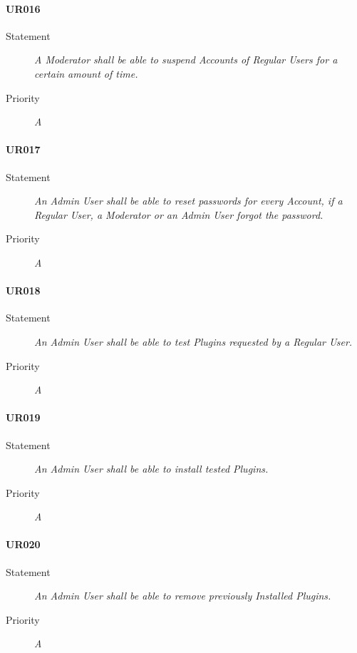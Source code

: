 \paragraph*{UR016}
\begin{description}
  \item [Statement] 
    \textit{A \gls{Moderator} shall be able to suspend \gls{Account}s of \gls{Regular User}s for a certain amount of time.}
  \item [Priority] \textit{A}
\end{description}

\paragraph*{UR017}
\begin{description}
  \item [Statement] 
    \textit{An \gls{Admin User} shall be able to reset passwords for every \gls{Account}, if a \gls{Regular User}, a \gls{Moderator} or an \gls{Admin User} forgot the password.}
  \item [Priority] \textit{A}
\end{description}

\paragraph*{UR018}
\begin{description}
  \item [Statement] 
    \textit{An \gls{Admin User} shall be able to test \gls{Plugins} requested by a \gls{Regular User}.}
  \item [Priority] \textit{A}
\end{description}

\paragraph*{UR019}
\begin{description}
  \item [Statement] 
    \textit{An \gls{Admin User} shall be able to install tested \gls{Plugins}.}
  \item [Priority] \textit{A}
\end{description}

\paragraph*{UR020}
\begin{description}
  \item [Statement] 
    \textit{An \gls{Admin User} shall be able to remove previously \gls{Installed Plugins}.}
  \item [Priority] \textit{A}
\end{description}

